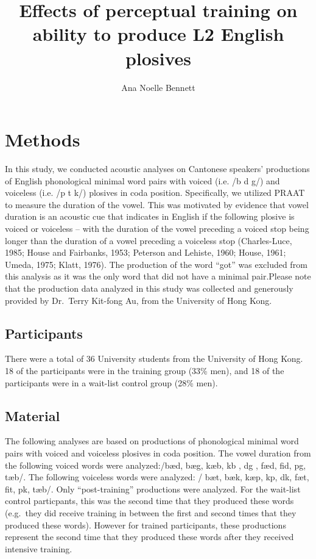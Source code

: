 \documentclass[man]{apa6}
\title{Effects of perceptual training on ability to produce L2 English plosives}
\author{Ana Noelle Bennett}
\affiliation{
    \vspace{0.5cm}
          \textsuperscript{} Rutgers, the State University of New Jersey  }
\theoremstyle{definition}
\theoremstyle{definition}
\theoremstyle{definition}
\theoremstyle{remark}
\begin{document}
\maketitle

\setcounter{secnumdepth}{0}



\section{Methods}\label{methods}

In this study, we conducted acoustic analyses on Cantonese speakers'
productions of English phonological minimal word pairs with voiced (i.e.
/b d g/) and voiceless (i.e. /p t k/) plosives in coda position.
Specifically, we utilized PRAAT to measure the duration of the vowel.
This was motivated by evidence that vowel duration is an acoustic cue
that indicates in English if the following plosive is voiced or
voiceless -- with the duration of the vowel preceding a voiced stop
being longer than the duration of a vowel preceding a voiceless stop
(Charles-Luce, 1985; House and Fairbanks, 1953; Peterson and Lehiste,
1960; House, 1961; Umeda, 1975; Klatt, 1976). The production of the word
\enquote{got} was excluded from this analysis as it was the only word
that did not have a minimal pair.Please note that the production data
analyzed in this study was collected and generously provided by
Dr.~Terry Kit-fong Au, from the University of Hong Kong.

\subsection{Participants}\label{participants}

There were a total of 36 University students from the University of Hong
Kong. 18 of the participants were in the training group (33\% men), and
18 of the participants were in a wait-list control group (28\% men).

\subsection{Material}\label{material}

The following analyses are based on productions of phonological minimal
word pairs with voiced and voiceless plosives in coda position. The
vowel duration from the following voiced words were analyzed:/b\ae d,
bæg, k\ae b, k\textturnv b , d\textopeno g , f\ae d, fid, p\textsci g,
t\ae b/. The following voiceless words were analyzed: / b\ae t, b\ae k,
k\ae p, k\textturnv p, d\textscripta k, f\ae t, fit, p\textsci k,
t\ae b/. Only \enquote{post-training} productions were analyzed. For the
wait-list control particpants, this was the second time that they
produced these words (e.g.~they did receive training in between the
first and second times that they produced these words). However for
trained participants, these productions represent the second time that
they produced these words after they received intensive training.
\end{document}
